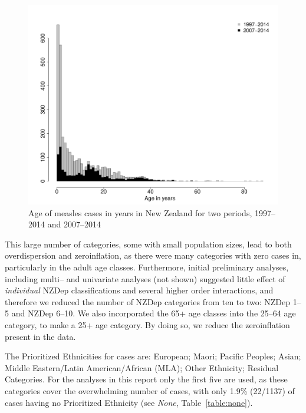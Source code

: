 \documentclass{article}
\begin{document}
\begin{itemize}
\begin{figure}
\begin{center}
\includegraphics{draftfinalreport-002}
\end{center}
\caption{Age of measles cases in years in New Zealand for two periods, 1997--2014 and 2007--2014}
\label{fig:ageinyears}
\end{figure}





This large number of categories, some with small population sizes, lead to both overdispersion and zeroinflation, as there were many categories with zero cases in, particularly in the adult age classes. Furthermore, initial preliminary analyses, including multi-- and univariate analyses (not shown) suggested little effect of \textit{individual} NZDep classifications and several higher order interactions, and therefore we reduced the number of NZDep categories from ten to two: NZDep 1--5 and NZDep 6--10. We also incorporated the 65+ age classes into the 25--64 age category, to make a 25+ age category. By doing so, we reduce the zeroinflation present in the data. 

The Prioritized Ethnicities for cases are:  European; Maori; Pacific Peoples; Asian; Middle Eastern/Latin American/African (MLA); Other Ethnicity; Residual Categories. For the analyses in this report only the first five are used, as these categories cover the overwhelming number of cases, with only 1.9\% (22/1137) of cases having no Prioritized Ethnicity (see \emph{None}, Table~\ref{table:none}). 


\end{itemize}
\end{document}
